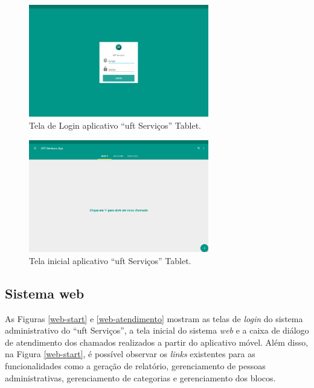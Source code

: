 \begin{figure}[H]
  \centering
  \includegraphics[width=0.7\textwidth]{figuras/tabapp-login-uftservicos.png} 
  \caption{Tela de Login aplicativo ``\acrshort{uft} Serviços'' Tablet.}
  \label{tabapp-login} 
\end{figure}

\begin{figure}[H]
  \centering
  \includegraphics[width=0.7\textwidth]{figuras/tabapp-start-uftservicos.png} 
  \caption{Tela inicial aplicativo ``\acrshort{uft} Serviços'' Tablet.}
  \label{tabapp-start} 
\end{figure}

\subsection*{Sistema web}

\noindent As Figuras \ref{web-start} e \ref{web-atendimento} mostram as telas de \textit{login} do sistema administrativo do ``\acrshort{uft} Serviços'', a tela inicial do sistema \textit{web} e a caixa de diálogo de atendimento dos chamados realizados a partir do aplicativo móvel. Além disso, na Figura \ref{web-start}, é possível observar os \textit{links} existentes para as funcionalidades como a geração de relatório, gerenciamento de pessoas administrativas, gerenciamento de categorias e gerenciamento dos blocos.


